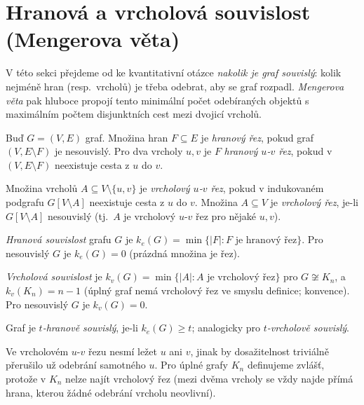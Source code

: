 \documentclass[11pt,a4paper]{article}
\begin{document}
\section{Hranová a vrcholová souvislost (Mengerova věta)}

V této sekci přejdeme od  ke kvantitativní otázce \emph{nakolik je graf souvislý}: kolik nejméně hran (resp.\ vrcholů) je třeba odebrat, aby se graf rozpadl. \emph{Mengerova věta} pak hluboce propojí tento minimální počet odebíraných objektů s maximálním počtem disjunktních cest mezi dvojicí vrcholů.

\begin{definice}
Buď $G=(V,E)$ graf. Množina hran $F\subseteq E$ je \emph{hranový řez}, pokud graf $(V,E\setminus F)$ je nesouvislý. Pro dva vrcholy $u,v$ je $F$ \emph{hranový $u$-$v$ řez}, pokud v $(V,E\setminus F)$ neexistuje cesta z $u$ do $v$.

Množina vrcholů $A\subseteq V\setminus\{u,v\}$ je \emph{vrcholový $u$-$v$ řez}, pokud v indukovaném podgrafu $G[V\setminus A]$ neexistuje cesta z $u$ do $v$. Množina $A\subseteq V$ je \emph{vrcholový řez}, je-li $G[V\setminus A]$ nesouvislý (tj.\ $A$ je vrcholový $u$-$v$ řez pro nějaké $u,v$).
\end{definice}

\begin{definice}
\emph{Hranová souvislost} grafu $G$ je $k_e(G)=\min\{|F|:F\text{ je hranový řez}\}$. Pro nesouvislý $G$ je $k_e(G)=0$ (prázdná množina je řez).

\emph{Vrcholová souvislost} je $k_v(G)=\min\{|A|:A\text{ je vrcholový řez}\}$ pro $G\not\cong K_n$, a $k_v(K_n)=n-1$ (úplný graf nemá vrcholový řez ve smyslu definice; konvence). Pro nesouvislý $G$ je $k_v(G)=0$.

Graf je \emph{$t$-hranově souvislý}, je-li $k_e(G)\ge t$; analogicky pro \emph{$t$-vrcholově souvislý}.
\end{definice}

\begin{poznamka}
Ve vrcholovém $u$-$v$ řezu nesmí ležet $u$ ani $v$, jinak by dosažitelnost triviálně přerušilo už odebrání samotného $u$. Pro úplné grafy $K_n$ definujeme zvlášť, protože v $K_n$ nelze najít vrcholový řez (mezi dvěma vrcholy se vždy najde přímá hrana, kterou žádné odebrání vrcholu neovlivní).
\end{poznamka}
\end{document}
